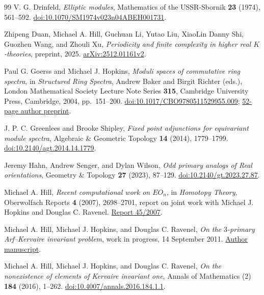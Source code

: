 \documentclass[11pt]{article}
\theoremstyle{definition}
\theoremstyle{remark}
\numberwithin{equation}{section}
\begin{document}
\begin{thebibliography}{99}
V. G. Drinfeld,
\emph{Elliptic modules},
Mathematics of the USSR-Sbornik \textbf{23} (1974), 561--592.
\href{https://doi.org/10.1070/SM1974v023n04ABEH001731}{doi:10.1070/SM1974v023n04ABEH001731}.

Zhipeng Duan, Michael A. Hill, Guchuan Li, Yutao Liu,
XiaoLin Danny Shi, Guozhen Wang, and Zhouli Xu,
\emph{Periodicity and finite complexity in higher real $K$-theories},
preprint, 2025.
\href{https://arxiv.org/abs/2512.01161v2}{arXiv:2512.01161v2}.

Paul G. Goerss and Michael J. Hopkins,
\emph{Moduli spaces of commutative ring spectra},
in \emph{Structured Ring Spectra},
Andrew Baker and Birgit Richter (eds.),
London Mathematical Society Lecture Note Series \textbf{315},
Cambridge University Press, Cambridge, 2004, pp.~151--200.
\href{https://doi.org/10.1017/CBO9780511529955.009}{doi:10.1017/CBO9780511529955.009};
\href{https://www.sas.rochester.edu/mth/sites/doug-ravenel/otherpapers/sum.pdf}{52-page author preprint}.

J. P. C. Greenlees and Brooke Shipley,
\emph{Fixed point adjunctions for equivariant module spectra},
Algebraic \& Geometric Topology \textbf{14} (2014), 1779--1799.
\href{https://doi.org/10.2140/agt.2014.14.1779}{doi:10.2140/agt.2014.14.1779}.

Jeremy Hahn, Andrew Senger, and Dylan Wilson,
\emph{Odd primary analogs of Real orientations},
Geometry \& Topology \textbf{27} (2023), 87--129.
\href{https://doi.org/10.2140/gt.2023.27.87}{doi:10.2140/gt.2023.27.87}.

Michael A. Hill,
\emph{Recent computational work on $EO_n$},
in \emph{Homotopy Theory},
Oberwolfach Reports \textbf{4} (2007), 2698--2701,
report on joint work with Michael J. Hopkins and Douglas C. Ravenel.
\href{https://publications.mfo.de/bitstream/handle/mfo/3031/OWR_2007_45.pdf?isAllowed=y\&sequence=1}{Report 45/2007}.

Michael A. Hill, Michael J. Hopkins, and Douglas C. Ravenel,
\emph{On the $3$-primary Arf--Kervaire invariant problem},
work in progress, 14 September 2011.
\href{https://www.sas.rochester.edu/mth/sites/doug-ravenel/mypapers/odd.pdf}{Author manuscript}.

Michael A. Hill, Michael J. Hopkins, and Douglas C. Ravenel,
\emph{On the nonexistence of elements of Kervaire invariant one},
Annals of Mathematics (2) \textbf{184} (2016), 1--262.
\href{https://doi.org/10.4007/annals.2016.184.1.1}{doi:10.4007/annals.2016.184.1.1}.


\end{thebibliography}
\end{document}
